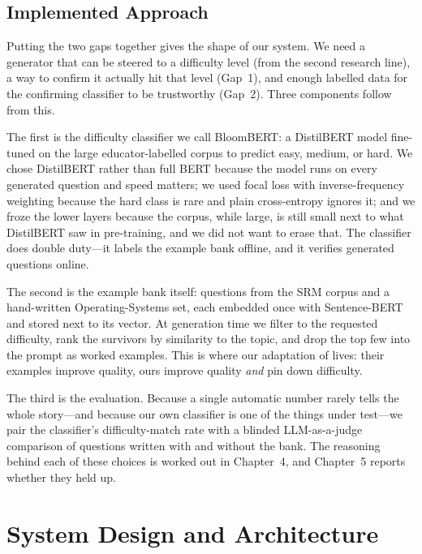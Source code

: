 \documentclass[12pt,a4paper]{report}
\begin{document}
\section{Implemented Approach}
Putting the two gaps together gives the shape of our system. We need a generator
that can be steered to a difficulty level (from the second research line), a way
to confirm it actually hit that level (Gap~1), and enough labelled data for the
confirming classifier to be trustworthy (Gap~2). Three components follow from
this.

The first is the difficulty classifier we call BloomBERT: a DistilBERT model
fine-tuned on the large educator-labelled corpus to predict easy, medium, or
hard. We chose DistilBERT rather than full BERT because the model runs on every
generated question and speed matters; we used focal loss with inverse-frequency
weighting because the hard class is rare and plain cross-entropy ignores it; and
we froze the lower layers because the corpus, while large, is still small next to
what DistilBERT saw in pre-training, and we did not want to erase that. The
classifier does double duty---it labels the example bank offline, and it verifies
generated questions online.

The second is the example bank itself: questions from the SRM corpus and a
hand-written Operating-Systems set, each embedded once with Sentence-BERT and
stored next to its vector. At generation time we filter to the requested
difficulty, rank the survivors by similarity to the topic, and drop the top few
into the prompt as worked examples. This is where our adaptation of
\textcite{maity2025icl} lives: their examples improve quality, ours improve
quality \emph{and} pin down difficulty.

The third is the evaluation. Because a single automatic number rarely tells the
whole story---and because our own classifier is one of the things under test---we
pair the classifier's difficulty-match rate with a blinded LLM-as-a-judge
comparison of questions written with and without the bank. The reasoning behind
each of these choices is worked out in Chapter~4, and Chapter~5 reports whether
they held up.

\chapter{System Design and Architecture}
\end{document}
